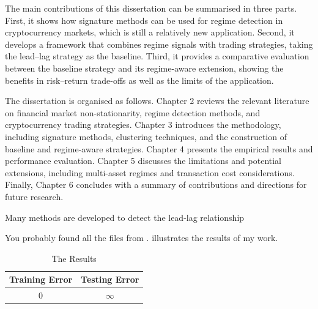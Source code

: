 The main contributions of this dissertation can be summarised in three parts. First, it shows how signature methods can be used for regime detection in cryptocurrency markets, which is still a relatively new application. Second, it develops a framework that combines regime signals with trading strategies, taking the lead–lag strategy as the baseline. Third, it provides a comparative evaluation between the baseline strategy and its regime-aware extension, showing the benefits in risk–return trade-offs as well as the limits of the application.

The dissertation is organised as follows. Chapter 2 reviews the relevant literature on financial market non-stationarity, regime detection methods, and cryptocurrency trading strategies. Chapter 3 introduces the methodology, including signature methods, clustering techniques, and the construction of baseline and regime-aware strategies. Chapter 4 presents the empirical results and performance evaluation. Chapter 5 discusses the limitations and potential extensions, including multi-asset regimes and transaction cost considerations. Finally, Chapter 6 concludes with a summary of contributions and directions for future research.


\iffalse
Many methods are developed to detect the lead-lag relationship

You probably found all the files from \cite{Gunn:2001:pdflatex}.
 illustrates the results of my work.
\begin{table}[!htb]
  \centering
  \begin{tabular}{cc}
  \toprule
  \textbf{Training Error} & \textbf{Testing Error}\\
  \midrule
  0 & $\infty$\\
  \bottomrule
  \end{tabular}
  \caption{The Results}
  \label{Table:tabex}
\end{table}

